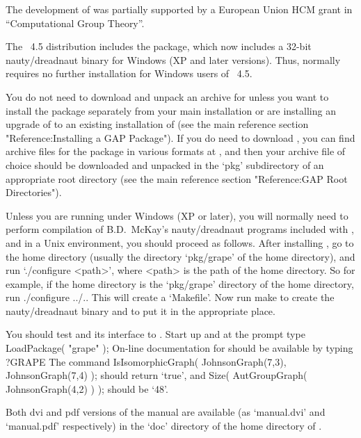 The development of {\GRAPE} was partially supported by a European Union
HCM grant in ``Computational Group Theory''.


The {\GAP}~4.5 distribution includes the {\GRAPE} package, which now
includes a 32-bit nauty/dreadnaut binary for Windows (XP and later
versions).  Thus, {\GRAPE} normally requires no further installation
for Windows users of {\GAP}~4.5.

You do not need to download and unpack an archive for {\GRAPE}
unless you want to install the package separately from your main
{\GAP} installation or are installing an upgrade of {\GRAPE} to an
existing installation of {\GAP} (see the main {\GAP} reference section
"Reference:Installing a GAP Package").  If you do need to download
{\GRAPE}, you can find archive files for the package in various formats
at , and then your
archive file of choice should be downloaded and unpacked in the `pkg'
subdirectory of an appropriate {\GAP} root directory (see the main {\GAP}
reference section "Reference:GAP Root Directories").

Unless you are running {\GRAPE} under Windows (XP or later), you will
normally need to perform compilation of B.D.~McKay's nauty/dreadnaut
programs included with {\GRAPE}, and in a Unix environment, you should
proceed as follows.  After installing {\GAP}, go to the {\GRAPE}
home directory (usually the directory `pkg/grape' of the {\GAP} home
directory), and run `./configure <path>', where <path> is the path of the
{\GAP} home directory.  So for example, if the {\GRAPE} home directory
is the `pkg/grape' directory of the {\GAP} home directory, run
\begintt 
./configure ../..  
\endtt
This will create a `Makefile'. Now run
\begintt
make
\endtt
to create the nauty/dreadnaut binary and to put it in the appropriate place.

You should test {\GRAPE} and its interface to {\nauty}.  Start up
{\GAP} and at the prompt type 
\begintt 
LoadPackage( "grape" ); 
\endtt
On-line documentation for {\GRAPE} should be available by typing 
\begintt
?GRAPE 
\endtt 
The command 
\begintt 
IsIsomorphicGraph( JohnsonGraph(7,3), JohnsonGraph(7,4) ); 
\endtt 
should return `true', and 
\begintt 
Size( AutGroupGraph( JohnsonGraph(4,2) ) ); 
\endtt 
should be `48'.

Both dvi and pdf versions of the {\GRAPE} manual are available
(as `manual.dvi' and `manual.pdf' respectively) in the `doc' directory
of the home directory of {\GRAPE}.

